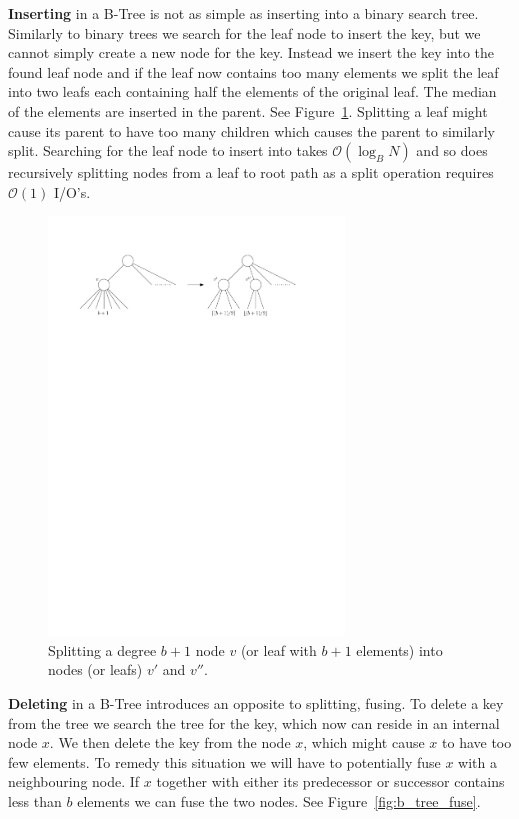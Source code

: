 \documentclass[twoside,11pt,openright]{report}
\begin{document}
\textbf{Inserting} in a B-Tree is not as simple as inserting into a binary search tree. Similarly to binary trees we search for the leaf node to insert the key, but we cannot simply create a new node for the key. Instead we insert the key into the found leaf node and if the leaf now contains too many elements we split the leaf into two leafs each containing half the elements of the original leaf. The median of the elements are inserted in the parent. See Figure~\ref{fig:b_tree_split}. Splitting a leaf might cause its parent to have too many children which causes the parent to similarly split.
Searching for the leaf node to insert into takes $\mathcal{O}(\log_B N)$ and so does recursively splitting nodes from a leaf to root path as a split operation requires $\mathcal{O}(1)$ I/O's.

\begin{figure}[H]
	\centering
	\includegraphics[width=0.7\textwidth]{../figures/b_tree_split}
	\caption{Splitting a degree $b+1$ node $v$ (or leaf with $b+1$ elements) into nodes (or leafs) $v'$ and $v''$.}
	\label{fig:b_tree_split}
\end{figure}

\textbf{Deleting} in a B-Tree introduces an opposite to splitting, fusing. To delete a key from the tree we search the tree for the key, which now can reside in an internal node $x$. We then delete the key from the node $x$, which might cause $x$ to have too few elements. To remedy this situation we will have to potentially fuse $x$ with a neighbouring node. If $x$ together with either its predecessor or successor contains less than $b$ elements we can fuse the two nodes. See Figure~\ref{fig:b_tree_fuse}.
\end{document}
